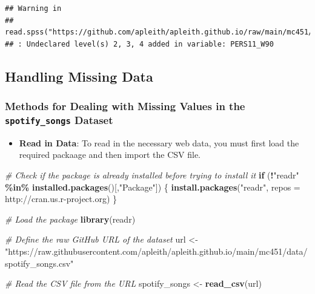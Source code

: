 \documentclass[
  b5paper]{book}
\newenvironment{Shaded}{\begin{snugshade}}{\end{snugshade}}
\newcommand{\AttributeTok}[1]{\textcolor[rgb]{0.13,0.29,0.53}{#1}}
\newcommand{\CommentTok}[1]{\textcolor[rgb]{0.56,0.35,0.01}{\textit{#1}}}
\newcommand{\ControlFlowTok}[1]{\textcolor[rgb]{0.13,0.29,0.53}{\textbf{#1}}}
\newcommand{\FunctionTok}[1]{\textcolor[rgb]{0.13,0.29,0.53}{\textbf{#1}}}
\newcommand{\NormalTok}[1]{#1}
\newcommand{\OtherTok}[1]{\textcolor[rgb]{0.56,0.35,0.01}{#1}}
\newcommand{\SpecialCharTok}[1]{\textcolor[rgb]{0.81,0.36,0.00}{\textbf{#1}}}
\newcommand{\StringTok}[1]{\textcolor[rgb]{0.31,0.60,0.02}{#1}}
\providecommand{\tightlist}{%
  \setlength{\itemsep}{0pt}\setlength{\parskip}{0pt}}
\begin{document}
\begin{verbatim}
## Warning in
## read.spss("https://github.com/apleith/apleith.github.io/raw/main/mc451/data/ATP%20W90.sav",
## : Undeclared level(s) 2, 3, 4 added in variable: PERS11_W90
\end{verbatim}

\hypertarget{handling-missing-data}{%
\subsection*{Handling Missing Data}\label{handling-missing-data}}

\hypertarget{methods-for-dealing-with-missing-values-in-the-spotify_songs-dataset}{%
\subsubsection*{\texorpdfstring{Methods for Dealing with Missing Values in the \texttt{spotify\_songs} Dataset}{Methods for Dealing with Missing Values in the spotify\_songs Dataset}}\label{methods-for-dealing-with-missing-values-in-the-spotify_songs-dataset}}

\begin{itemize}
\tightlist
\item
  \textbf{Read in Data}: To read in the necessary web data, you must first load the required packaage and then import the CSV file.
\end{itemize}

\begin{Shaded}
\begin{Highlighting}[]
\CommentTok{\# Check if the package is already installed before trying to install it}
\ControlFlowTok{if}\NormalTok{ (}\SpecialCharTok{!}\StringTok{"readr"} \SpecialCharTok{\%in\%} \FunctionTok{installed.packages}\NormalTok{()[,}\StringTok{"Package"}\NormalTok{]) \{}
  \FunctionTok{install.packages}\NormalTok{(}\StringTok{"readr"}\NormalTok{, }\AttributeTok{repos =} \StringTok{\textquotesingle{}http://cran.us.r{-}project.org\textquotesingle{}}\NormalTok{)}
\NormalTok{\}}

\CommentTok{\# Load the package}
\FunctionTok{library}\NormalTok{(readr)}

\CommentTok{\# Define the raw GitHub URL of the dataset}
\NormalTok{url }\OtherTok{\textless{}{-}} \StringTok{"https://raw.githubusercontent.com/apleith/apleith.github.io/main/mc451/data/spotify\_songs.csv"}

\CommentTok{\# Read the CSV file from the URL}
\NormalTok{spotify\_songs }\OtherTok{\textless{}{-}} \FunctionTok{read\_csv}\NormalTok{(url)}
\end{Highlighting}
\end{Shaded}
\end{document}
